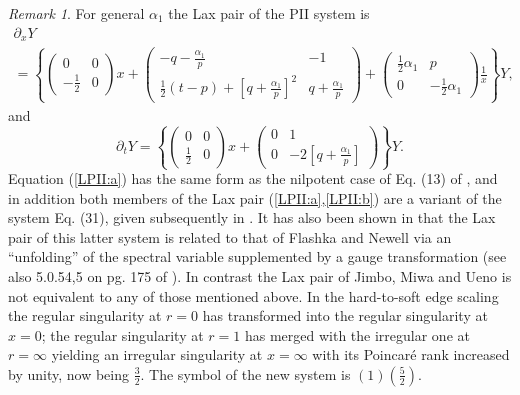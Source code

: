 \documentclass[10pt,reqno]{amsart}
\theoremstyle{plain}
\theoremstyle{definition}
\theoremstyle{remark}
\newtheorem{remark}{Remark}
\begin{document}
\begin{remark}
For general $ \alpha_1 $ the Lax pair of the PII system is 
\begin{multline}
 \partial_x Y
\\
 = \left\{ \begin{pmatrix}
            0 & 0 \\ -\frac{1}{2} & 0 
           \end{pmatrix} x
          +\begin{pmatrix}
            -q-\frac{\displaystyle \alpha_1}{\displaystyle p} & -1 \\
             \frac{1}{2}(t-p)+\left[q+\frac{\displaystyle \alpha_1}{\displaystyle p}\right]^2 & q+\frac{\displaystyle \alpha_1}{\displaystyle p}
           \end{pmatrix}
           +\begin{pmatrix}
             \frac{1}{2}\alpha_1 & p \\ 0 & -\frac{1}{2}\alpha_1 
            \end{pmatrix} \frac{1}{x}
   \right\} Y ,
\label{LPII:a}
\end{multline}
and
\begin{equation}
  \partial_t Y
 = \left\{ \begin{pmatrix}
            0 & 0 \\ \frac{1}{2} & 0 
           \end{pmatrix} x
          +\begin{pmatrix}
            0 & 1 \\ 0 & -2\left[ q+\frac{\displaystyle \alpha_1}{\displaystyle p} \right]
           \end{pmatrix}
   \right\} Y .
\label{LPII:b}
\end{equation}
Equation (\ref{LPII:a}) has the same form as the nilpotent case of Eq. (13) of \cite{Kapaev_2002}, and in addition both
members of the Lax pair (\ref{LPII:a},\ref{LPII:b}) are a variant of the system Eq. (31), given subsequently in \cite{Kapaev_2002}.
It has also been shown in \cite{KH_1999} that the Lax pair of this latter system is related to that of 
Flashka and Newell \cite{FN_1980} via an ``unfolding'' of the spectral variable supplemented by a gauge transformation
(see also 5.0.54,5 on pg. 175 of \cite{FIKN_2006}). In contrast the Lax pair of Jimbo, Miwa and Ueno \cite{JM_1981a} is not
equivalent to any of those mentioned above. In the hard-to-soft edge scaling the regular 
singularity at $ r=0 $ has transformed into the regular singularity at $ x=0 $; the regular singularity at 
$ r=1 $ has merged with the irregular one at $ r=\infty $ yielding an irregular singularity at $ x=\infty $
with its Poincar\'e rank increased by unity, now being $ \tfrac{3}{2} $. The symbol of the new system is
$ (1)(\tfrac{5}{2}) $.
\end{remark}
\end{document}
